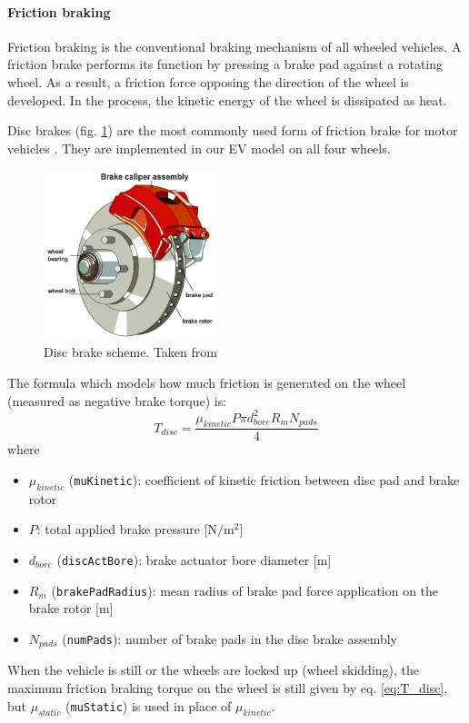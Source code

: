 \paragraph{Friction braking}
Friction braking is the conventional braking mechanism of all wheeled vehicles. A friction brake performs its function by pressing a brake pad against a rotating wheel. As a result, a friction force opposing the direction of the wheel is developed. In the process, the kinetic energy of the wheel is dissipated as heat.

Disc brakes (fig. \ref{fig:disc_brakes}) are the most commonly used form of friction brake for motor vehicles \cite{wiki:disc_brakes}. They are implemented in our EV model on all four wheels.

\begin{figure}[htb]
    \centering
    \includegraphics[width=0.45\textwidth]{images/disc_brakes}
    \caption[Disc brake]{Disc brake scheme. Taken from \cite{machinedesign_braking}}
    \label{fig:disc_brakes}
\end{figure}

The formula which models how much friction is generated on the wheel (measured as negative brake torque) is:
\begin{equation}
T_{disc} = \frac{\mu_{kinetic} P \pi d_{bore}^2 R_m N_{pads}}{4}
\label{eq:T_disc}
\end{equation}
where
\begin{itemize}
    \item $\mu_{kinetic}$ (\texttt{muKinetic}): coefficient of kinetic friction between disc pad and brake rotor
    \item $P$: total applied brake pressure [$\text{N}/\text{m}^2$]
    \item $d_{bore}$ (\texttt{discActBore}): brake actuator bore diameter [m]
    \item $R_m$ (\texttt{brakePadRadius}): mean radius of brake pad force application on the brake rotor [m]
    \item $N_{pads}$ (\texttt{numPads}): number of brake pads in the disc brake assembly
\end{itemize}
When the vehicle is still or the wheels are locked up (wheel skidding), the maximum friction braking torque on the wheel is still given by eq. \ref{eq:T_disc}, but $\mu_{static}$ (\texttt{muStatic}) is used in place of $\mu_{kinetic}$.

